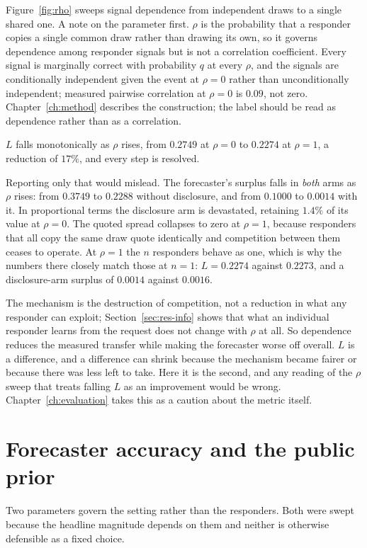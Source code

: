 Figure~\ref{fig:rho} sweeps signal dependence from independent draws to a single shared
one. A note on the parameter first. $\rho$ is the probability that a responder copies a single common
draw rather than drawing its own, so it governs dependence among responder signals but is
not a correlation coefficient. Every signal is marginally correct with probability $q$ at
every $\rho$, and the signals are conditionally independent given the event at $\rho = 0$
rather than unconditionally independent; measured pairwise correlation at $\rho = 0$ is
$0.09$, not zero. Chapter~\ref{ch:method} describes the construction; the label should be
read as dependence rather than as a correlation.

$L$ falls monotonically as $\rho$ rises, from $0.2749$ at $\rho=0$ to $0.2274$ at $\rho=1$,
a reduction of $17\%$, and every step is resolved.

Reporting only that would mislead. The forecaster's surplus falls in \emph{both} arms as
$\rho$ rises: from $0.3749$ to $0.2288$ without disclosure, and from $0.1000$ to $0.0014$
with it. In proportional terms the disclosure arm is devastated, retaining $1.4\%$ of its
value at $\rho=0$. The quoted spread collapses to zero at $\rho=1$, because responders that
all copy the same draw quote identically and competition between them ceases to operate. At
$\rho=1$ the $n$ responders behave as one, which is why the numbers there closely match
those at $n=1$: $L = 0.2274$ against $0.2273$, and a disclosure-arm surplus of $0.0014$
against $0.0016$.

The mechanism is the destruction of competition, not a reduction in what any responder can
exploit; Section~\ref{sec:res-info} shows that what an individual responder learns from the
request does not change with $\rho$ at all. So dependence reduces the measured transfer
while making the forecaster worse off overall. $L$ is a difference, and a difference can
shrink because the mechanism became fairer or because there was less left to take. Here it
is the second, and any reading of the $\rho$ sweep that treats falling $L$ as an improvement
would be wrong. Chapter~\ref{ch:evaluation} takes this as a caution about the metric itself.

\section{Forecaster accuracy and the public prior}
\label{sec:res-qf}

Two parameters govern the setting rather than the responders. Both were swept because the
headline magnitude depends on them and neither is otherwise defensible as a fixed choice.

